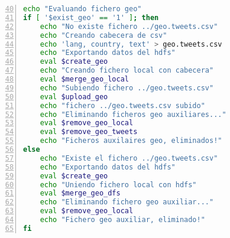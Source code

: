 \begin{lstlisting}[label=tw:bash2,language=sh,frame=single,caption=Código bash de evaluación. , firstnumber=40,numbers=left]
echo "Evaluando fichero geo"
if [ '$exist_geo' == '1' ]; then
	echo "No existe fichero ../geo.tweets.csv"
	echo "Creando cabecera de csv"
	echo 'lang, country, text' > geo.tweets.csv
	echo "Exportando datos del hdfs"
	eval $create_geo
	echo "Creando fichero local con cabecera"
	eval $merge_geo_local
	echo "Subiendo fichero ../geo.tweets.csv"
	eval $upload_geo
	echo "fichero ../geo.tweets.csv subido"
	echo "Eliminando ficheros geo auxiliares..."
	eval $remove_geo_local
	eval $remove_geo_tweets
	echo "Ficheros auxilaires geo, eliminados!"
else
	echo "Existe el fichero ../geo.tweets.csv"
	echo "Exportando datos del hdfs"
	eval $create_geo
	echo "Uniendo fichero local con hdfs"
	eval $merge_geo_dfs
	echo "Eliminando fichero geo auxiliar..."
	eval $remove_geo_local
	echo "Fichero geo auxiliar, eliminado!"
fi
\end{lstlisting}